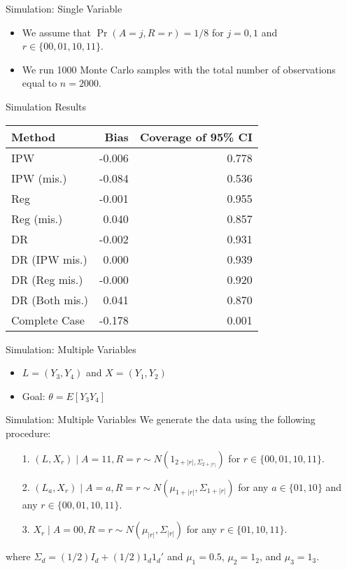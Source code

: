 \documentclass{beamer} %
\begin{document}
\begin{frame}{Simulation: Single Variable}
  \begin{itemize}
    \item We assume that $\Pr(A = j, R = r) = 1/8$ for $j = 0, 1$ and $r \in \{00,
      01, 10, 11\}$.
    \item We run 1000 Monte Carlo samples with the total number of observations
      equal to $n = 2000$.
  \end{itemize}
\end{frame}

\begin{frame}{Simulation Results}
  \begin{center}
  \begin{tabular}{lrr}
    \toprule
    Method & Bias & Coverage of 95\% CI \\
    \midrule
    IPW             & -0.006 & 0.778 \\
    IPW (mis.)      & -0.084 & 0.536 \\
    Reg             & -0.001 & 0.955 \\
    Reg (mis.)      &  0.040 & 0.857 \\
    DR              & -0.002 & 0.931 \\
    DR (IPW mis.)   &  0.000 & 0.939 \\
    DR (Reg mis.)   & -0.000 & 0.920 \\
    DR (Both mis.)  &  0.041 & 0.870 \\
    Complete Case   & -0.178 & 0.001 \\
    \bottomrule
  \end{tabular}
  \end{center}
\end{frame}

\begin{frame}{Simulation: Multiple Variables}
  \begin{itemize}
    \item $L = (Y_3, Y_4)$ and $X = (Y_1, Y_2)$
    \item Goal: $\theta = E[Y_3 Y_4]$
  \end{itemize}
\end{frame}

\begin{frame}{Simulation: Multiple Variables}
  We generate the data using the following procedure:
  \begin{itemize}
    \item[1.] $(L, X_r) \mid A = 11, R = r \sim N(1_{2 + |r|, \Sigma_{2+|r|}})$
      for $r \in \{00, 01, 10, 11\}$.
    \item[2.] $(L_a, X_r) \mid A = a, R = r \sim N(\mu_{1 + |r|}, \Sigma_{1+|r|})$
      for any $a \in \{01, 10\}$ and any $r \in \{00, 01, 10, 11\}$.
    \item[3.] $X_r \mid A = 00, R = r \sim N(\mu_{|r|}, \Sigma_{|r|})$ for any
      $r \in \{01, 10, 11\}$.
  \end{itemize}

  where $\Sigma_d = (1/2) I_d + (1/2) 1_d 1_d'$ and $\mu_1 = 0.5$, $\mu_2 = 1_2$,
  and $\mu_3 = 1_3$.
\end{frame}
\end{document}
